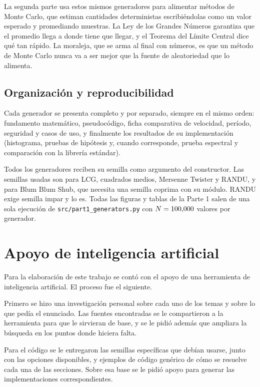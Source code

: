 \documentclass[11pt,letterpaper]{article}
\newcommand{\code}[1]{\texttt{#1}}
\begin{document}
La segunda parte usa estos mismos generadores para alimentar métodos de Monte
Carlo, que estiman cantidades deterministas escribiéndolas como un valor
esperado y promediando muestras. La Ley de los Grandes Números garantiza que
el promedio llega a donde tiene que llegar, y el Teorema del Límite Central
dice qué tan rápido. La moraleja, que se arma al final con números, es que un
método de Monte Carlo nunca va a ser mejor que la fuente de aleatoriedad que
lo alimenta.

\subsection*{Organización y reproducibilidad}

Cada generador se presenta completo y por separado, siempre en el mismo
orden: fundamento matemático, pseudocódigo, ficha comparativa de velocidad,
período, seguridad y casos de uso, y finalmente los resultados de su
implementación (histograma, pruebas de hipótesis y, cuando corresponde,
prueba espectral y comparación con la librería estándar).

Todos los generadores reciben su semilla como argumento del constructor. Las
semillas usadas son \textbf{\Semilla} para LCG, cuadrados medios, Mersenne
Twister y RANDU, y \textbf{\SemillaBBS} para Blum Blum Shub, que necesita una
semilla coprima con su módulo. RANDU exige semilla impar y \Semilla{} lo es.
Todas las figuras y tablas de la Parte 1 salen de una sola ejecución de
\code{src/part1\_generators.py} con $N = 100{,}000$ valores por generador.

\newpage
\section{Apoyo de inteligencia artificial}

Para la elaboración de este trabajo se contó con el apoyo de una herramienta
de inteligencia artificial. El proceso fue el siguiente.

Primero se hizo una investigación personal sobre cada uno de los temas y
sobre lo que pedía el enunciado. Las fuentes encontradas se le compartieron a
la herramienta para que le sirvieran de base, y se le pidió además que
ampliara la búsqueda en los puntos donde hiciera falta.

Para el código se le entregaron las semillas específicas que debían usarse,
junto con las opciones disponibles, y ejemplos de código genérico de cómo se
resuelve cada una de las secciones. Sobre esa base se le pidió apoyo para
generar las implementaciones correspondientes.
\end{document}
